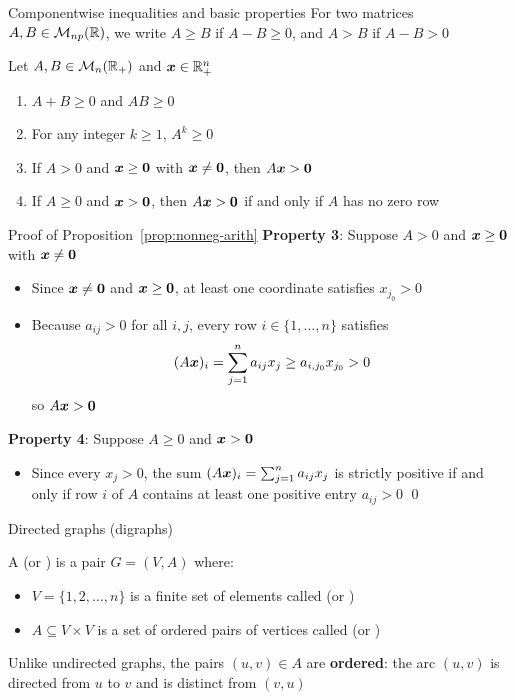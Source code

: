 \documentclass[aspectratio=169]{beamer}\usepackage[]{graphicx}\usepackage[]{xcolor}
\begin{document}
\begin{frame}{Componentwise inequalities and basic properties}
For two matrices $A, B \in \mathcal{M}_{np}(\mathbb{R})$, we write $A \ge B$ if $A - B \ge 0$, and $A > B$ if $A - B > 0$
\vfill
\begin{proposition}
\label{prop:nonneg-arith}
Let $A, B \in \mathcal{M}_n(\mathbb{R}_+)$ and $\bm{x} \in \mathbb{R}_+^n$
\begin{enumerate}
\item $A + B \ge 0$ and $AB \ge 0$
\item For any integer $k \ge 1$, $A^k \ge 0$
\item If $A > 0$ and $\bx \ge \b0$ with $\bx \neq \b0$, then $A\bx > \b0$
\item If $A \ge 0$ and $\bx > \b0$, then $A\bx > \b0$ if and only if $A$ has no zero row
\end{enumerate}
\end{proposition}
\end{frame}

\begin{frame}{Proof of Proposition~\ref{prop:nonneg-arith}}
\textbf{Property 3}: Suppose $A > 0$ and $\bx \ge \b0$ with $\bx \neq \b0$
\begin{itemize}
\item Since $\bx \neq \b0$ and $\bx \ge \b0$, at least one coordinate satisfies $x_{j_0} > 0$
\item Because $a_{ij} > 0$ for all $i, j$, every row $i \in \{1, \ldots, n\}$ satisfies
\[
(A\bm{x})_i = \sum_{j=1}^n a_{ij} x_j \ge a_{i,j_0} x_{j_0} > 0
\]
so $A\bx > \b0$
\end{itemize}
\vfill
\textbf{Property 4}: Suppose $A \ge 0$ and $\bx > \b0$
\begin{itemize}
\item Since every $x_j > 0$, the sum $(A\bm{x})_i = \sum_{j=1}^n a_{ij} x_j$ is strictly positive if and only if row $i$ of $A$ contains at least one positive entry $a_{ij} > 0$ \hfill\qed
\end{itemize}
\end{frame}

\begin{frame}{Directed graphs (digraphs)}
\begin{importantdefinition}
A  (or ) is a pair $G = (V, A)$ where:
\begin{itemize}
\item $V = \{1, 2, \ldots, n\}$ is a finite set of elements called  (or )
\item $A \subseteq V \times V$ is a set of ordered pairs of vertices called  (or )
\end{itemize}
\end{importantdefinition}
\vfill
Unlike undirected graphs, the pairs $(u, v) \in A$ are \textbf{ordered}: the arc $(u, v)$ is directed from $u$ to $v$ and is distinct from $(v, u)$
\end{frame}
\end{document}
